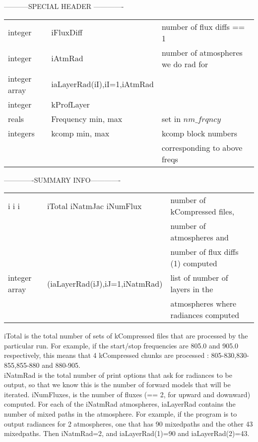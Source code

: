 \documentclass[12pt]{article}
\newlength{\colwidth}
\begin{document}
{{{{-----------SPECIAL HEADER -------------\\
\begin{longtable}{llp{\colwidth}}
{\sf integer}       & iFluxDiff & number of flux diffs == 1\\
{\sf integer}       & iAtmRad & number of atmospheres we do rad for\\
{\sf integer array} & iaLayerRad(iI),iI=1,iAtmRad & \\


{\sf integer}    & kProfLayer &\\
{\sf reals}      & Frequency min, max &set in $nm\_frqncy$\\
{\sf integers}   & kcomp min, max  & kcomp block numbers \\
                 &                 & corresponding to above freqs \\
\end{longtable}

-------------SUMMARY INFO-------------\\
\begin{longtable}{llp{\colwidth}}
{\sf i i i} & \indent iTotal iNatmJac iNumFlux & number of kCompressed files,\\
            &                                & number of atmospheres and \\
            &                           & number of flux diffs (1) computed\\
{\sf integer array}  & \indent \indent (iaLayerRad(iJ),iJ=1,iNatmRad) &list 
  of number of layers in the \\
   &  & atmospheres where radiances computed\\
\end{longtable}

iTotal is the total number of sets of kCompressed files that are processed by
the particular run. For example, if the start/stop frequencies are 805.0 and 
905.0 respectively, this means that 4 kCompressed chunks are processed : 
805-830,830-855,855-880 and 880-905. \\

iNatmRad is the total number of print options that ask for radiances to be
output, so that we know this is the number of forward models that will be
iterated. iNumFluxes, is the number of fluxes (== 2, for upward and downward) 
computed. For each of the iNatmRad atmospheres, 
iaLayerRad contains the number of mixed paths in the atmosphere.
For example, if the program is to output radiances for 2 atmospheres, one 
that has 90 mixedpaths and the other 43 mixedpaths. Then iNatmRad=2, and 
iaLayerRad(1)=90 and iaLayerRad(2)=43.

}}}}
\end{document}
